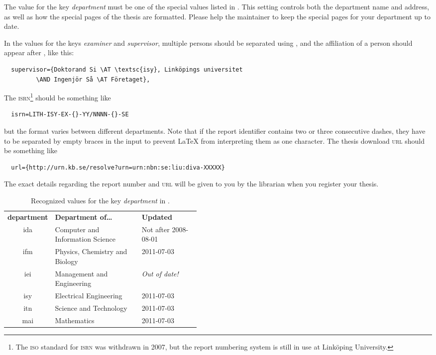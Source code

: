 The value for the key \emph{department} must be one of the special values listed in .  This setting controls both the department name and address, as well as how the special pages of the thesis are formatted.  Please help the \rtthesis maintainer to keep the special pages for your department up to date.

In the values for the keys \emph{examiner} and \emph{supervisor}, multiple persons should be separated using , and the affiliation of a person should appear after , like this:
{\verbatimsize
\begin{verbatim}
  supervisor={Doktorand Si \AT \textsc{isy}, Linköpings universitet
         \AND Ingenjör Så \AT Företaget},
\end{verbatim}}

The \textsc{isrn}\footnote{The \textsc{iso} standard for \textsc{isrn} was withdrawn in 2007, but the report numbering system is still in use at Linköping University.} should be something like
{\verbatimsize
\begin{verbatim}
  isrn=LITH-ISY-EX-{}-YY/NNNN-{}-SE
\end{verbatim}}
but the format varies between different departments.  Note that if the report identifier contains two or three consecutive dashes, they have to be separated by empty braces in the input to prevent \LaTeX{} from interpreting them as one character.  The thesis download \textsc{url} should be something like
{\verbatimsize
\begin{verbatim}
  url={http://urn.kb.se/resolve?urn=urn:nbn:se:liu:diva-XXXXX}
\end{verbatim}}
The exact details regarding the report number and \textsc{url} will be given to you by the librarian when you register your thesis.

\begin{table}[tbp]
  \centering
  \begin{tabular}{>{\ttfamily}c p{0.45\linewidth} l}
    \toprule%
    \textbf{department} & \textbf{Department of\ldots} & \textbf{Updated}\\
    \otoprule%
    ida & Computer and Information Science & Not after 2008-08-01\\
    ifm & Physics, Chemistry and Biology & 2011-07-03\\
    iei & Management and Engineering & \emph{Out of date!}\\
    isy & Electrical Engineering & 2011-07-03\\
    itn & Science and Technology & 2011-07-03\\
    mai & Mathematics & 2011-07-03\\
    \bottomrule%
  \end{tabular}
  \caption{\label{tab:department}%
    Recognized values for the key \emph{department} in .}
\end{table}

